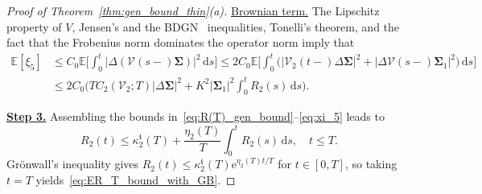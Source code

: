 \documentclass[en,oneside,bbfont,article]{amsart}
\theoremstyle{remark}
\theoremstyle{definition}
\theoremstyle{definition}
\newcommand{\V}{\bm{\mathcal{V}}}
\newcommand\E{\mathds{E}}
\newcommand\e{\mathord{\mathrm{e}}}
\newcommand\1{\mathds{1}}
\renewcommand\le{\leqslant}
\newcommand{\D}{\mathrm{d}}
\newcommand{\mft}{{\mathfrak{t}}}
\begin{document}
\begin{proof}[Proof of Theorem~\ref{thm:gen_bound_thin}(a)]
{\underline{Brownian term.}} 
The Lipschitz property of $V$, Jensen's and the BDGN~\cite[Thm~1.1]{MR3463679} inequalities, Tonelli's theorem, and the fact that the Frobenius norm dominates the operator norm imply that
\begin{align}
\E[\xi_5]
&\le C_0\E\bigg[\int_0^t|\Delta(\V(s-)\bm{\Sigma})|^2\,\D s \bigg]
\le 2C_0\E\bigg[\int_0^t\big(|\V_2(t-)\Delta\bm{\Sigma}|^2
    +|\Delta\V(s-)\bm{\Sigma}_1|^2\big)\,\D s\bigg]\nonumber\\
&\le 2C_0\bigg(TC_2(\V_2;T)|\Delta\bm\Sigma|^2 
+ K^2|\bm\Sigma_1|^2 \int_0^t R_2(s)
\,\D s\bigg).\label{eq:xi_5}
\end{align}

\underline{\textbf{Step 3.}} Assembling the bounds in~\eqref{eq:R(T)_gen_bound}--\eqref{eq:xi_5} leads to
\begin{equation*}
R_2(t)
\le \kappa_2^\mft(T) + \frac{\eta_2(T)}{T}\int_0^t R_2(s)\,\D s,
\quad t\le T.
\end{equation*}
Gr\"onwall's inequality gives $R_2(t) \le \kappa_2^\mft(T)\e^{\eta_2(T)t/T}$ for $t\in[0,T]$, so taking $t=T$ yields~\eqref{eq:ER_T_bound_with_GB}.
\end{proof}
\end{document}
